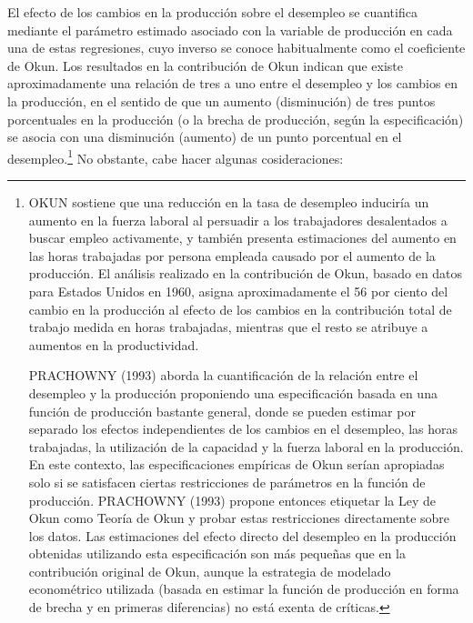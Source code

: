\documentclass[10pt,a4paper]{article}
\begin{document}
El efecto de los cambios en la producción sobre el desempleo se cuantifica mediante el parámetro estimado asociado con la variable de producción en cada una de estas regresiones, cuyo inverso se conoce habitualmente como el coeficiente de Okun. Los resultados en la contribución de Okun indican que existe aproximadamente una relación de tres a uno entre el desempleo y los cambios en la producción, en el sentido de que un aumento (disminución) de tres puntos porcentuales en la producción (o la brecha de producción, según la especificación) se asocia con una disminución (aumento) de un punto porcentual en el desempleo.\footnote{%
    OKUN sostiene que una reducción en la tasa de desempleo induciría un aumento en la fuerza laboral al persuadir a los trabajadores desalentados a buscar empleo activamente, y también presenta estimaciones del aumento en las horas trabajadas por persona empleada causado por el aumento de la producción. El análisis realizado en la contribución de Okun, basado en datos para Estados Unidos en 1960, asigna aproximadamente el 56 por ciento del cambio en la producción al efecto de los cambios en la contribución total de trabajo medida en horas trabajadas, mientras que el resto se atribuye a aumentos en la productividad. 

PRACHOWNY (1993) aborda la cuantificación de la relación entre el desempleo y la producción proponiendo una especificación basada en una función de producción bastante general, donde se pueden estimar por separado los efectos independientes de los cambios en el desempleo, las horas trabajadas, la utilización de la capacidad y la fuerza laboral en la producción. En este contexto, las especificaciones empíricas de Okun serían apropiadas solo si se satisfacen ciertas restricciones de parámetros en la función de producción. PRACHOWNY (1993) propone entonces etiquetar la Ley de Okun como Teoría de Okun y probar estas restricciones directamente sobre los datos.  Las estimaciones del efecto directo del desempleo en la producción obtenidas utilizando esta especificación son más pequeñas que en la contribución original de Okun, aunque la estrategia de modelado econométrico utilizada (basada en estimar la función de producción en forma de brecha y en primeras diferencias) no está exenta de críticas.
} No obstante, cabe hacer algunas cosideraciones:
\end{document}
